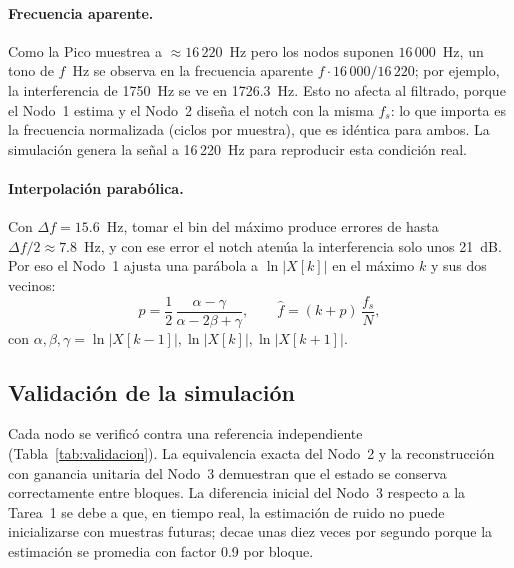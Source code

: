 \documentclass[11pt,a4paper]{article}
\begin{document}
\paragraph{Frecuencia aparente.}
Como la Pico muestrea a $\approx 16\,220$~Hz pero los nodos suponen
$16\,000$~Hz, un tono de $f$~Hz se observa en la frecuencia aparente
$f \cdot 16\,000/16\,220$; por ejemplo, la interferencia de 1750~Hz se ve en
1726.3~Hz. Esto no afecta al filtrado, porque el Nodo~1 estima y el Nodo~2
diseña el notch con la misma $f_s$: lo que importa es la frecuencia
normalizada (ciclos por muestra), que es idéntica para ambos. La simulación
genera la señal a 16\,220~Hz para reproducir esta condición real.
 
\paragraph{Interpolación parabólica.}
Con $\Delta f = 15.6$~Hz, tomar el bin del máximo produce errores de hasta
$\Delta f/2 \approx 7.8$~Hz, y con ese error el notch atenúa la interferencia
solo unos 21~dB. Por eso el Nodo~1 ajusta una parábola a $\ln|X[k]|$ en el
máximo $k$ y sus dos vecinos:
\begin{equation}
  p = \frac{1}{2}\,\frac{\alpha - \gamma}{\alpha - 2\beta + \gamma}, \qquad
  \hat f = (k + p)\,\frac{f_s}{N},
\end{equation}
con $\alpha, \beta, \gamma = \ln|X[k-1]|, \ln|X[k]|, \ln|X[k+1]|$.
 
\subsection{Validación de la simulación}
Cada nodo se verificó contra una referencia independiente
(Tabla~\ref{tab:validacion}). La equivalencia exacta del Nodo~2 y la
reconstrucción con ganancia unitaria del Nodo~3 demuestran que el estado se
conserva correctamente entre bloques. La diferencia inicial del Nodo~3
respecto a la Tarea~1 se debe a que, en tiempo real, la estimación de ruido
no puede inicializarse con muestras futuras; decae unas diez veces por
segundo porque la estimación se promedia con factor 0.9 por bloque.
 
\end{document}
